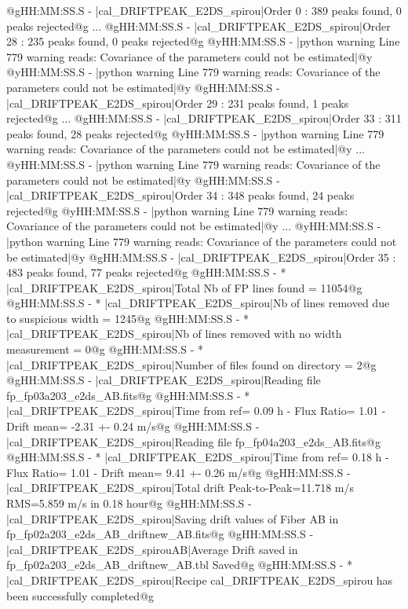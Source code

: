 \begin{cmdboxprintspecial}[fontupper=\tiny, fontlower=\tiny]
@gHH:MM:SS.S -   |cal_DRIFTPEAK_E2DS_spirou|Order 0 : 389 peaks found, 0 peaks rejected@g
...
@gHH:MM:SS.S -   |cal_DRIFTPEAK_E2DS_spirou|Order 28 : 235 peaks found, 0 peaks rejected@g
@yHH:MM:SS.S - \@ |python warning Line 779  warning reads: Covariance of the parameters could not be estimated|@y
@yHH:MM:SS.S - \@ |python warning Line 779  warning reads: Covariance of the parameters could not be estimated|@y
@gHH:MM:SS.S -   |cal_DRIFTPEAK_E2DS_spirou|Order 29 : 231 peaks found, 1 peaks rejected@g
...
@gHH:MM:SS.S -   |cal_DRIFTPEAK_E2DS_spirou|Order 33 : 311 peaks found, 28 peaks rejected@g
@yHH:MM:SS.S - \@ |python warning Line 779  warning reads: Covariance of the parameters could not be estimated|@y
...
@yHH:MM:SS.S - \@ |python warning Line 779  warning reads: Covariance of the parameters could not be estimated|@y
@gHH:MM:SS.S -   |cal_DRIFTPEAK_E2DS_spirou|Order 34 : 348 peaks found, 24 peaks rejected@g
@yHH:MM:SS.S - \@ |python warning Line 779  warning reads: Covariance of the parameters could not be estimated|@y
...
@yHH:MM:SS.S - \@ |python warning Line 779  warning reads: Covariance of the parameters could not be estimated|@y
@gHH:MM:SS.S -   |cal_DRIFTPEAK_E2DS_spirou|Order 35 : 483 peaks found, 77 peaks rejected@g
@gHH:MM:SS.S - * |cal_DRIFTPEAK_E2DS_spirou|Total Nb of FP lines found = 11054@g
@gHH:MM:SS.S - * |cal_DRIFTPEAK_E2DS_spirou|Nb of lines removed due to suspicious width = 1245@g
@gHH:MM:SS.S - * |cal_DRIFTPEAK_E2DS_spirou|Nb of lines removed with no width measurement = 0@g
@gHH:MM:SS.S - * |cal_DRIFTPEAK_E2DS_spirou|Number of files found on directory = 2@g
@gHH:MM:SS.S -   |cal_DRIFTPEAK_E2DS_spirou|Reading file fp_fp03a203_e2ds_AB.fits@g
@gHH:MM:SS.S - * |cal_DRIFTPEAK_E2DS_spirou|Time from ref= 0.09 h - Flux Ratio= 1.01 - Drift mean= -2.31 +- 0.24 m/s@g
@gHH:MM:SS.S -   |cal_DRIFTPEAK_E2DS_spirou|Reading file fp_fp04a203_e2ds_AB.fits@g
@gHH:MM:SS.S - * |cal_DRIFTPEAK_E2DS_spirou|Time from ref= 0.18 h - Flux Ratio= 1.01 - Drift mean= 9.41 +- 0.26 m/s@g
@gHH:MM:SS.S -   |cal_DRIFTPEAK_E2DS_spirou|Total drift Peak-to-Peak=11.718 m/s RMS=5.859 m/s in 0.18 hour@g
@gHH:MM:SS.S -   |cal_DRIFTPEAK_E2DS_spirou|Saving drift values of Fiber AB in fp_fp02a203_e2ds_AB_driftnew_AB.fits@g
@gHH:MM:SS.S -   |cal_DRIFTPEAK_E2DS_spirouAB|Average Drift saved in fp_fp02a203_e2ds_AB_driftnew_AB.tbl Saved@g
@gHH:MM:SS.S - * |cal_DRIFTPEAK_E2DS_spirou|Recipe cal_DRIFTPEAK_E2DS_spirou has been successfully completed@g
\end{cmdboxprintspecial}



